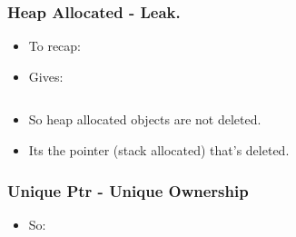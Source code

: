 \hypertarget{heap-allocated---leak.}{%
\subsubsection{Heap Allocated - Leak.}\label{heap-allocated---leak.}}

\begin{itemize}
\tightlist
\item
  To recap:
\end{itemize}

\begin{Shaded}
\begin{Highlighting}[]
\NormalTok{,}\NormalTok{);}
\NormalTok{\}}

\end{Highlighting}
\end{Shaded}

\begin{itemize}
\tightlist
\item
  Gives:
\end{itemize}

\begin{verbatim}
\end{verbatim}

\begin{itemize}
\tightlist
\item
  So heap allocated objects are not deleted.
\item
  Its the pointer (stack allocated) that's deleted.
\end{itemize}

\hypertarget{unique-ptr---unique-ownership}{%
\subsubsection{Unique Ptr - Unique
Ownership}\label{unique-ptr---unique-ownership}}

\begin{itemize}
\tightlist
\item
  So:
\end{itemize}

\begin{Shaded}
\begin{Highlighting}[]
  \NormalTok{,}\NormalTok{));}
\NormalTok{\}}

\end{Highlighting}
\end{Shaded}

